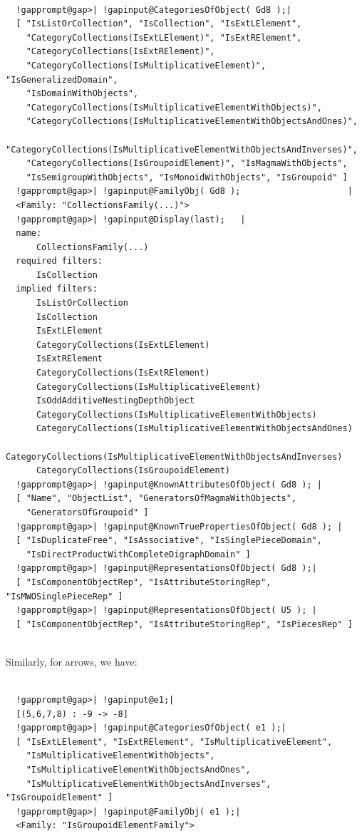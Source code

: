 \documentclass[a4paper,11pt]{report}
\begin{document}
{{ 
\begin{Verbatim}[commandchars=!@|,fontsize=\small,frame=single,label=Example]
  
  !gapprompt@gap>| !gapinput@CategoriesOfObject( Gd8 );|
  [ "IsListOrCollection", "IsCollection", "IsExtLElement", 
    "CategoryCollections(IsExtLElement)", "IsExtRElement", 
    "CategoryCollections(IsExtRElement)", 
    "CategoryCollections(IsMultiplicativeElement)", "IsGeneralizedDomain", 
    "IsDomainWithObjects", 
    "CategoryCollections(IsMultiplicativeElementWithObjects)", 
    "CategoryCollections(IsMultiplicativeElementWithObjectsAndOnes)", 
    "CategoryCollections(IsMultiplicativeElementWithObjectsAndInverses)", 
    "CategoryCollections(IsGroupoidElement)", "IsMagmaWithObjects", 
    "IsSemigroupWithObjects", "IsMonoidWithObjects", "IsGroupoid" ]
  !gapprompt@gap>| !gapinput@FamilyObj( Gd8 );                     |
  <Family: "CollectionsFamily(...)">
  !gapprompt@gap>| !gapinput@Display(last);   |
  name:
      CollectionsFamily(...)
  required filters:
      IsCollection
  implied filters:
      IsListOrCollection
      IsCollection
      IsExtLElement
      CategoryCollections(IsExtLElement)
      IsExtRElement
      CategoryCollections(IsExtRElement)
      CategoryCollections(IsMultiplicativeElement)
      IsOddAdditiveNestingDepthObject
      CategoryCollections(IsMultiplicativeElementWithObjects)
      CategoryCollections(IsMultiplicativeElementWithObjectsAndOnes)
      CategoryCollections(IsMultiplicativeElementWithObjectsAndInverses)
      CategoryCollections(IsGroupoidElement)
  !gapprompt@gap>| !gapinput@KnownAttributesOfObject( Gd8 ); |
  [ "Name", "ObjectList", "GeneratorsOfMagmaWithObjects", 
    "GeneratorsOfGroupoid" ]
  !gapprompt@gap>| !gapinput@KnownTruePropertiesOfObject( Gd8 ); |
  [ "IsDuplicateFree", "IsAssociative", "IsSinglePieceDomain", 
    "IsDirectProductWithCompleteDigraphDomain" ]
  !gapprompt@gap>| !gapinput@RepresentationsOfObject( Gd8 );|
  [ "IsComponentObjectRep", "IsAttributeStoringRep", "IsMWOSinglePieceRep" ]
  !gapprompt@gap>| !gapinput@RepresentationsOfObject( U5 ); |
  [ "IsComponentObjectRep", "IsAttributeStoringRep", "IsPiecesRep" ]
  
\end{Verbatim}
 Similarly, for arrows, we have: 

 
\begin{Verbatim}[commandchars=!@|,fontsize=\small,frame=single,label=Example]
  
  !gapprompt@gap>| !gapinput@e1;|
  [(5,6,7,8) : -9 -> -8]
  !gapprompt@gap>| !gapinput@CategoriesOfObject( e1 );|
  [ "IsExtLElement", "IsExtRElement", "IsMultiplicativeElement", 
    "IsMultiplicativeElementWithObjects", 
    "IsMultiplicativeElementWithObjectsAndOnes", 
    "IsMultiplicativeElementWithObjectsAndInverses", "IsGroupoidElement" ]
  !gapprompt@gap>| !gapinput@FamilyObj( e1 );|
  <Family: "IsGroupoidElementFamily">
  

\end{Verbatim}}}
\end{document}
